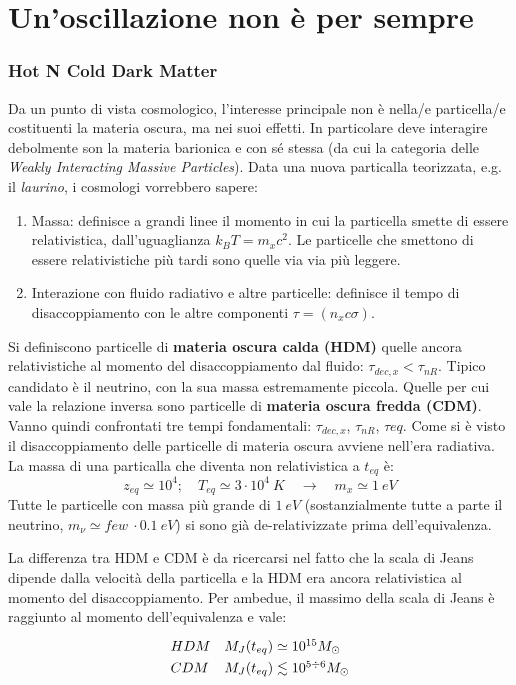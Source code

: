 \chapter{Un'oscillazione non è per sempre}\label{7:ch}

\subsection{Hot N Cold Dark Matter}
Da un punto di vista cosmologico, l'interesse principale non è nella/e particella/e costituenti la materia oscura, ma nei suoi effetti. In particolare deve interagire debolmente son la materia barionica e con sé stessa (da cui la categoria delle \textit{Weakly Interacting Massive Particles}). Data una nuova particalla teorizzata, e.g. il \textit{laurino}, i cosmologi vorrebbero sapere:
\begin{enumerate}
    \item Massa: definisce a grandi linee il momento in cui la particella smette di essere relativistica, dall'uguaglianza $k_B T = m_xc^2$. Le particelle che smettono di essere relativistiche più tardi sono quelle via via più leggere.
    \item Interazione con fluido radiativo e altre particelle: definisce il tempo di disaccoppiamento con le altre componenti $\tau = (n_x c \sigma)$.
\end{enumerate}
Si definiscono particelle di \textbf{materia oscura calda (HDM)} quelle ancora relativistiche al momento del disaccoppiamento dal fluido: $\tau_{dec,x}<\tau_{nR}$. Tipico candidato è il neutrino, con la sua massa estremamente piccola. Quelle per cui vale la relazione inversa sono particelle di \textbf{materia oscura fredda (CDM)}. Vanno quindi confrontati tre tempi fondamentali: $\tau_{dec,x}$, $\tau_{nR}$, $\tau{eq}$. 
Come si è visto il disaccoppiamento delle particelle di materia oscura avviene nell'era radiativa. La massa di una particalla che diventa non relativistica a $t_{eq}$ è:
$$
z_{eq}\simeq 10^4; \quad T_{eq}\simeq 3\cdot 10^4 \: K \quad \rightarrow \quad m_x\simeq 1\: eV
$$
Tutte le particelle con massa più grande di $1\: eV$ (sostanzialmente tutte a parte il neutrino, $m_\nu\simeq few\:\cdot 0.1\: eV$) si sono già de-relativizzate prima dell'equivalenza.

\vspace{1em}

La differenza tra HDM e CDM è da ricercarsi nel fatto che la scala di Jeans dipende dalla velocità della particella e la HDM era ancora relativistica al momento del disaccoppiamento. Per ambedue, il massimo della scala di Jeans è raggiunto al momento dell'equivalenza e vale:
\begin{equation}\left.
    \def\arraystretch{1.3}
        \begin{array}{llll}
            
        HDM & M_J (t_{eq}) \simeq 10^{15} M_\odot\\
        CDM & M_J (t_{eq})\lesssim 10^{5\div 6} M_\odot
    \end{array}\right.
\end{equation}

